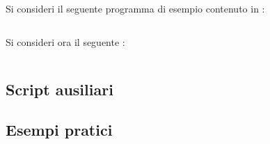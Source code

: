 \documentclass[11pt,letterpaper,twoside]{article}
\begin{document}
Si consideri il seguente programma di esempio contenuto in :

\inputminted[linenos, mathescape=true]{C}{../test.c}

Si consideri ora il seguente :

\inputminted[linenos]{makefile}{../makefile}

\subsection{Script ausiliari}

\subsection{Esempi pratici}



\newpage
\tableofcontents

\printbibliography
\end{document}
